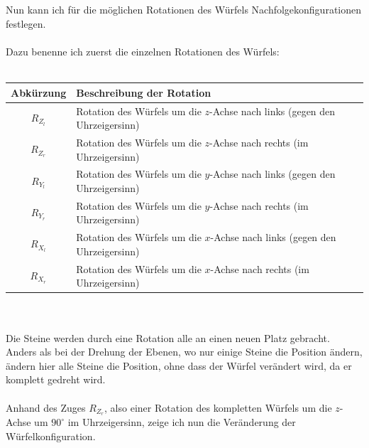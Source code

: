 \documentclass[12pt,a4paper, usenames, dvipsnames]{scrartcl}
\begin{document}
\ \\ 
\\
Nun kann ich für die möglichen Rotationen des Würfels Nachfolgekonfigurationen festlegen. \\
\\
Dazu benenne ich zuerst die einzelnen Rotationen des Würfels: \\
\\
\begin{tabular}{|c|l|}
\hline
Abkürzung & Beschreibung der Rotation \\
\hline
\hline
$R_{Z_l}$ & Rotation des Würfels um die $z$-Achse nach links (gegen den Uhrzeigersinn)\\
\hline
$R_{Z_r}$ & Rotation des Würfels um die $z$-Achse nach rechts (im Uhrzeigersinn)  \\
\hline
$R_{Y_l}$ & Rotation des Würfels um die $y$-Achse nach links (gegen den Uhrzeigersinn)\\
\hline
$R_{Y_r}$ & Rotation des Würfels um die $y$-Achse nach rechts (im Uhrzeigersinn)  \\
\hline
$R_{X_l}$ & Rotation des Würfels um die $x$-Achse nach links (gegen den Uhrzeigersinn)\\
\hline
$R_{X_r}$ & Rotation des Würfels um die $x$-Achse nach rechts (im Uhrzeigersinn) \\
\hline
\end{tabular} \\
\\
Die Steine werden durch eine Rotation alle an einen neuen Platz gebracht. Anders als bei der Drehung der Ebenen, wo nur einige Steine die Position ändern, ändern hier alle Steine die Position, ohne dass der Würfel verändert wird, da er komplett gedreht wird. \\
\\
Anhand des Zuges $R_{Z_r}$, also einer Rotation des kompletten Würfels um die $z$-Achse um $90^\circ$ im Uhrzeigersinn, zeige ich nun die Veränderung der Würfelkonfiguration. 
\end{document}
